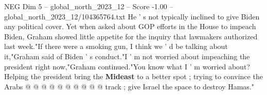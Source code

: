 \begin{textsample}{NEG Dim 5 – global\_north\_2023\_12 – Score -1.00 – global\_north\_2023\_12/104365764.txt}
He ' s not typically inclined to give Biden any political cover.
Yet when asked about GOP efforts in the House to impeach Biden, Graham showed little appetite for the inquiry that lawmakers authorized last week."If there were a smoking gun, I think we ' d be talking about it,"Graham said of Biden ' s conduct."I ' m not worried about impeaching the president right now,"Graham continued."You know what I ' m worried about?
Helping the president bring the \textbf{Mideast} to a better spot ; trying to convince the Arabs @ @ @ @ @ @ @ @ @ @ track ; give Israel the space to destroy Hamas."

\end{textsample}
